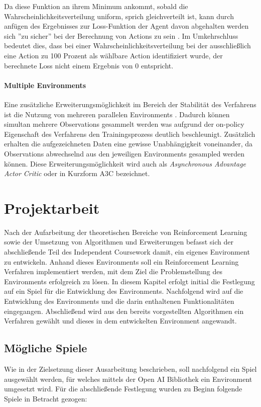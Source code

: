 \documentclass[11pt]{scrartcl}
\begin{document}
Da diese Funktion an ihrem Minimum ankommt, sobald die Wahrscheinlichkeitsverteilung uniform,
sprich gleichverteilt ist, kann durch anfügen des Ergebnisses zur Loss-Funktion der Agent davon
abgehalten werden sich ''zu sicher'' bei der Berechnung von Actions zu sein 
\cite[~S.269 f.]{L2018}. Im Umkehrschluss bedeutet dies, dass bei einer
Wahrscheinlichkeitsverteilung bei der ausschließlich eine Action zu 100 Prozent als wählbare
Action identifiziert wurde, der berechnete Loss nicht einem Ergebnis von 0 entspricht.

\paragraph*{Multiple Environments} 
\label{sec:multiple_envs}
\noindent
\newline
Eine zusätzliche Erweiterungsmöglichkeit im Bereich der Stabilität des Verfahrens ist die Nutzung
von mehreren parallelen Environments \cite[~S.270]{L2018}. Dadurch können simultan mehrere
Observations gesammelt werden was aufgrund der on-policy Eigenschaft des Verfahrens den
Trainingsprozess deutlich beschleunigt. Zusätzlich erhalten die aufgezeichneten Daten eine
gewisse Unabhängigkeit voneinander, da Observations abwechselnd aus den jeweiligen Environments
gesampled werden können. Diese Erweiterungsmöglichkeit wird auch als \textit{Asynchronous Advantage
Actor Critic} oder in Kurzform A3C bezeichnet.

\newpage
\section{Projektarbeit}
Nach der Aufarbeitung der theoretischen Bereiche von Reinforcement Learning sowie der Umsetzung von
Algorithmen und Erweiterungen befasst sich der abschließende Teil des Independent Coursework damit,
ein eigenes Environment zu entwickeln. Anhand dieses Environments soll ein Reinforcement Learning
Verfahren implementiert werden, mit dem Ziel die Problemstellung des Environments erfolgreich zu 
lösen. In diesem Kapitel erfolgt initial die Festlegung auf ein Spiel für die Entwicklung des
Environments. Nachfolgend wird auf die Entwicklung des Environments und die darin enthaltenen
Funktionalitäten eingegangen. Abschließend wird aus den bereits vorgestellten Algorithmen ein
Verfahren gewählt und dieses in dem entwickelten Environment angewandt. 

\subsection{Mögliche Spiele}
Wie in der Zielsetzung dieser Ausarbeitung beschrieben, soll nachfolgend ein Spiel ausgewählt werden,
für welches mittels der Open AI Bibliothek ein Environment umgesetzt wird. Für die abschließende
Festlegung wurden zu Beginn folgende Spiele in Betracht gezogen:
\end{document}
